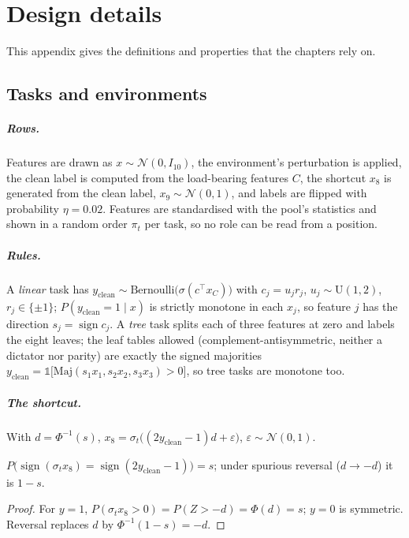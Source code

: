 \chapter{Design details}
\label{app:design}

This appendix gives the definitions and properties that the chapters rely on.

\section{Tasks and environments}

\paragraph{Rows.}
Features are drawn as $x \sim \mathcal{N}(0, I_{10})$, the environment's perturbation is applied, the clean label is computed from the load-bearing features $C$, the shortcut $x_8$ is generated from the clean label, $x_9 \sim \mathcal{N}(0,1)$, and labels are flipped with probability $\eta = 0.02$.
Features are standardised with the pool's statistics and shown in a random order $\pi_t$ per task, so no role can be read from a position.

\paragraph{Rules.}
A \emph{linear} task has $y_{\mathrm{clean}} \sim \mathrm{Bernoulli}\big(\sigma(c^\top x_C)\big)$ with $c_j = u_j r_j$, $u_j \sim \mathrm{U}(1,2)$, $r_j \in \{\pm 1\}$; $P(y_{\mathrm{clean}} = 1 \mid x)$ is strictly monotone in each $x_j$, so feature $j$ has the direction $s_j = \operatorname{sign} c_j$.
A \emph{tree} task splits each of three features at zero and labels the eight leaves; the leaf tables allowed (complement-antisymmetric, neither a dictator nor parity) are exactly the signed majorities $y_{\mathrm{clean}} = \mathbb{1}\big[\mathrm{Maj}(s_1 x_1, s_2 x_2, s_3 x_3) > 0\big]$, so tree tasks are monotone too.

\paragraph{The shortcut.}
With $d = \Phi^{-1}(s)$, $x_8 = \sigma_t\big((2y_{\mathrm{clean}} - 1)d + \varepsilon\big)$, $\varepsilon \sim \mathcal{N}(0,1)$.

\begin{proposition}
$P\big(\operatorname{sign}(\sigma_t x_8) = \operatorname{sign}(2y_{\mathrm{clean}}-1)\big) = s$; under spurious reversal ($d \to -d$) it is $1 - s$.
\end{proposition}
\begin{proof}
For $y = 1$, $P(\sigma_t x_8 > 0) = P(Z > -d) = \Phi(d) = s$; $y = 0$ is symmetric. Reversal replaces $d$ by $\Phi^{-1}(1-s) = -d$.
\end{proof}

